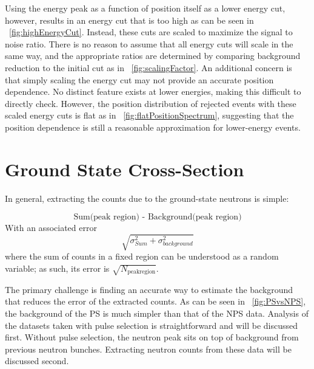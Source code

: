 Using the energy peak as a function of position itself as a lower energy cut, however, results in an energy cut that is too high as can be seen in {\fig}~\ref{fig:highEnergyCut}.  Instead, these cuts are scaled to maximize the signal to noise ratio.  There is no reason to assume that all energy cuts will scale in the same way, and the appropriate ratios are determined by comparing background reduction to the initial cut as in {\fig}~\ref{fig:scalingFactor}.  An additional concern is that simply scaling the energy cut may not provide an accurate position dependence.  No distinct feature exists at lower energies, making this difficult to directly check.  However, the position distribution of rejected events with these scaled energy cuts is flat as in {\fig}~\ref{fig:flatPositionSpectrum}, suggesting that the position dependence is still a reasonable approximation for lower-energy events.

\section{Ground State Cross-Section}

In general, extracting the counts due to the ground-state neutrons is simple:

\begin{equation}
\text{Sum(peak region) - Background(peak region)}
\label{eq:counts}
\end{equation}
With an associated error
\begin{equation}
\sqrt{\sigma_{Sum}^2 + \sigma_{background}^2}
\label{eq:errDef}
\end{equation}
where the sum of counts in a fixed region can be understood as a random variable; as such, its error is $\sqrt{N_{\text{peakregion}}}$.

The primary challenge is finding an accurate way to estimate the background that reduces the error of the extracted counts.  As can be seen in {\fig}~\ref{fig:PSvsNPS}, the background of the PS is much simpler than that of the NPS data.  Analysis of the datasets taken with pulse selection is straightforward and will be discussed first.  Without pulse selection, the neutron peak sits on top of background from previous neutron bunches.  Extracting neutron counts from these data will be discussed second.


